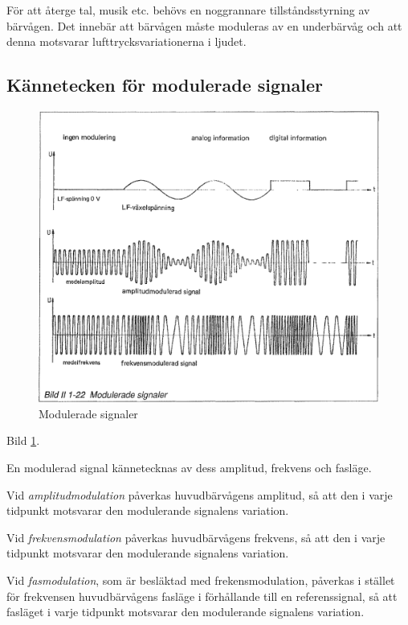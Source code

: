 För att återge tal, musik etc. behövs en noggrannare tillståndsstyrning av
bärvågen. Det innebär att bärvågen måste moduleras av en underbärvåg och att
denna motsvarar lufttrycksvariationerna i ljudet.

\subsection{Kännetecken för modulerade signaler}

\begin{figure}[ht]
\begin{center}
\includegraphics[width=14cm]{images/bild_2_1-22}
\caption{Modulerade signaler}
\label{fig:BildII1-22}
\end{center}
\end{figure}

Bild \ref{fig:BildII1-22}.

En modulerad signal kännetecknas av dess amplitud, frekvens och fasläge.

Vid \emph{amplitudmodulation} påverkas huvudbärvågens amplitud, så att den i
varje tidpunkt motsvarar den modulerande signalens variation.

Vid \emph{frekvensmodulation} påverkas huvudbärvågens frekvens, så att den i
varje tidpunkt motsvarar den modulerande signalens variation.

Vid \emph{fasmodulation}, som är besläktad med frekensmodulation, påverkas i
stället för frekvensen huvudbärvågens fasläge i förhållande till en
referenssignal, så att fasläget i varje tidpunkt motsvarar den modulerande
signalens variation.

